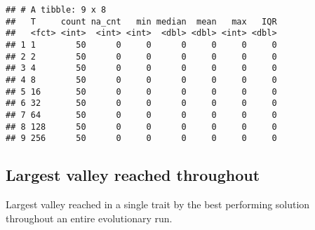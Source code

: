 \documentclass[]{book}
\begin{document}
\begin{verbatim}
## # A tibble: 9 x 8
##   T     count na_cnt   min median  mean   max   IQR
##   <fct> <int>  <int> <int>  <dbl> <dbl> <int> <dbl>
## 1 1        50      0     0      0     0     0     0
## 2 2        50      0     0      0     0     0     0
## 3 4        50      0     0      0     0     0     0
## 4 8        50      0     0      0     0     0     0
## 5 16       50      0     0      0     0     0     0
## 6 32       50      0     0      0     0     0     0
## 7 64       50      0     0      0     0     0     0
## 8 128      50      0     0      0     0     0     0
## 9 256      50      0     0      0     0     0     0
\end{verbatim}

\hypertarget{largest-valley-reached-throughout-2}{%
\subsection{Largest valley reached throughout}\label{largest-valley-reached-throughout-2}}

Largest valley reached in a single trait by the best performing solution throughout an entire evolutionary run.
\end{document}
